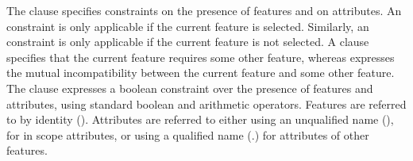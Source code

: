 The  clause specifies constraints on the presence of features and on attributes.
An  constraint is only applicable if the current feature is selected.
Similarly, an  constraint is only applicable if the current feature is not selected.
A  clause specifies that the current feature requires some other feature,
whereas  expresses the mutual incompatibility between the current feature and some
other feature.
%
The  clause expresses a boolean constraint over the presence of features and attributes, using standard boolean and arithmetic operators.
Features are referred to by identity (\fid). Attributes are referred to either using
an unqualified name (\aid), for in scope attributes, or using a qualified name (\fid.\aid)
for attributes of other features.



